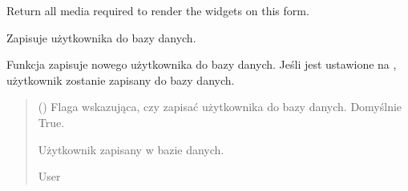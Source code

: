 \documentclass[letterpaper,10pt,polish]{sphinxmanual}
\begin{document}
\begin{fulllineitems}
\begin{fulllineitems}
\label{\detokenize{mainApp:mainApp.forms.UserForm.media}}
\pysigstartsignatures
{}
\pysigstopsignatures
\sphinxAtStartPar
Return all media required to render the widgets on this form.

\end{fulllineitems}


\begin{fulllineitems}
\label{\detokenize{mainApp:mainApp.forms.UserForm.save}}
\pysigstartsignatures
{}
\pysigstopsignatures
\sphinxAtStartPar
Zapisuje użytkownika do bazy danych.

\sphinxAtStartPar
Funkcja  zapisuje nowego użytkownika do bazy danych.
Jeśli  jest ustawione na , użytkownik zostanie zapisany
do bazy danych.
\begin{quote}\begin{description}
\sphinxAtStartPar
{} () \textendash{} Flaga wskazująca, czy zapisać użytkownika do bazy danych. Domyślnie True.

\sphinxAtStartPar
Użytkownik zapisany w bazie danych.

\sphinxAtStartPar
User

\end{description}\end{quote}

\end{fulllineitems}


\end{fulllineitems}
\end{document}
